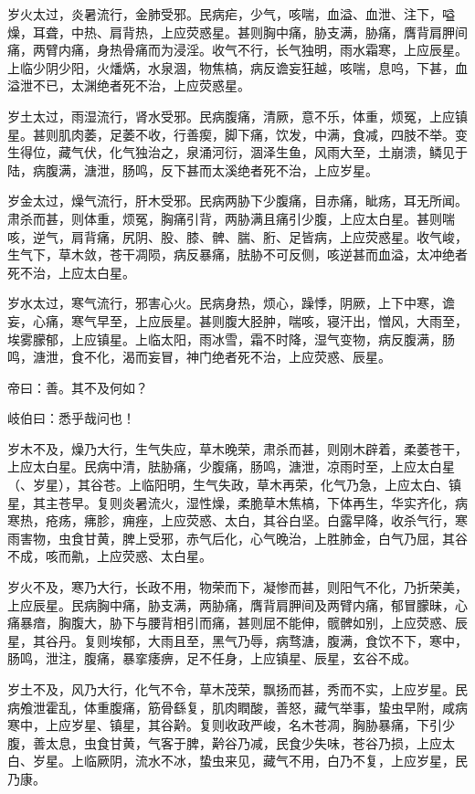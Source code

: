 \documentclass{article}%
\begin{document}
岁火太过，炎暑流行，金肺受邪。民病疟，少气，咳喘，血溢、血泄、注下，嗌燥，耳聋，中热、肩背热，上应荧惑星。甚则胸中痛，胁支满，胁痛，膺背肩胛间痛，两臂内痛，身热骨痛而为浸淫。收气不行，长气独明，雨水霜寒，上应辰星。上临少阴少阳，火燔焫，水泉涸，物焦槁，病反谵妄狂越，咳喘，息呜，下甚，血溢泄不已，太渊绝者死不治，上应荧惑星。

岁土太过，雨湿流行，肾水受邪。民病腹痛，清厥，意不乐，体重，烦冤，上应镇星。甚则肌肉萎，足萎不收，行善瘈，脚下痛，饮发，中满，食减，四肢不举。变生得位，藏气伏，化气独治之，泉涌河衍，涸泽生鱼，风雨大至，土崩溃，鳞见于陆，病腹满，溏泄，肠鸣，反下甚而太溪绝者死不治，上应岁星。

岁金太过，燥气流行，肝木受邪。民病两胁下少腹痛，目赤痛，眦疡，耳无所闻。肃杀而甚，则体重，烦冤，胸痛引背，两胁满且痛引少腹，上应太白星。甚则喘咳，逆气，肩背痛，尻阴、股、膝、髀、腨、胻、足皆病，上应荧惑星。收气峻，生气下，草木敛，苍干凋陨，病反暴痛，胠胁不可反侧，咳逆甚而血溢，太冲绝者死不治，上应太白星。

岁水太过，寒气流行，邪害心火。民病身热，烦心，躁悸，阴厥，上下中寒，谵妄，心痛，寒气早至，上应辰星。甚则腹大胫肿，喘咳，寝汗出，憎风，大雨至，埃雾朦郁，上应镇星。上临太阳，雨冰雪，霜不时降，湿气变物，病反腹满，肠鸣，溏泄，食不化，渴而妄冒，神门绝者死不治，上应荧惑、辰星。

帝曰：善。其不及何如？

岐伯曰：悉乎哉问也！

岁木不及，燥乃大行，生气失应，草木晚荣，肃杀而甚，则刚木辟着，柔萎苍干，上应太白星。民病中清，胠胁痛，少腹痛，肠鸣，溏泄，凉雨时至，上应太白星（、岁星），其谷苍。上临阳明，生气失政，草木再荣，化气乃急，上应太白、镇星，其主苍早。复则炎暑流火，湿性燥，柔脆草木焦槁，下体再生，华实齐化，病寒热，疮疡，疿胗，痈痤，上应荧惑、太白，其谷白坚。白露早降，收杀气行，寒雨害物，虫食甘黄，脾上受邪，赤气后化，心气晚治，上胜肺金，白气乃屈，其谷不成，咳而鼽，上应荧惑、太白星。

岁火不及，寒乃大行，长政不用，物荣而下，凝惨而甚，则阳气不化，乃折荣美，上应辰星。民病胸中痛，胁支满，两胁痛，膺背肩胛间及两臂内痛，郁冒朦昧，心痛暴瘖，胸腹大，胁下与腰背相引而痛，甚则屈不能伸，髋髀如别，上应荧惑、辰星，其谷丹。复则埃郁，大雨且至，黑气乃辱，病骛溏，腹满，食饮不下，寒中，肠鸣，泄注，腹痛，暴挛痿痹，足不任身，上应镇星、辰星，玄谷不成。

岁土不及，风乃大行，化气不令，草木茂荣，飘扬而甚，秀而不实，上应岁星。民病飧泄霍乱，体重腹痛，筋骨繇复，肌肉瞤酸，善怒，藏气举事，蛰虫早附，咸病寒中，上应岁星、镇星，其谷黅。复则收政严峻，名木苍凋，胸胁暴痛，下引少腹，善太息，虫食甘黄，气客于脾，黅谷乃减，民食少失味，苍谷乃损，上应太白、岁星。上临厥阴，流水不冰，蛰虫来见，藏气不用，白乃不复，上应岁星，民乃康。
\end{document}

